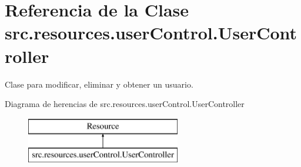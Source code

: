 \hypertarget{classsrc_1_1resources_1_1user_control_1_1_user_controller}{\section{Referencia de la Clase src.\-resources.\-user\-Control.\-User\-Controller}
\label{classsrc_1_1resources_1_1user_control_1_1_user_controller}
}


Clase para modificar, eliminar y obtener un usuario.  


Diagrama de herencias de src.\-resources.\-user\-Control.\-User\-Controller\begin{figure}[H]
\begin{center}
\leavevmode
\includegraphics[height=2.000000cm]{classsrc_1_1resources_1_1user_control_1_1_user_controller}
\end{center}
\end{figure}
